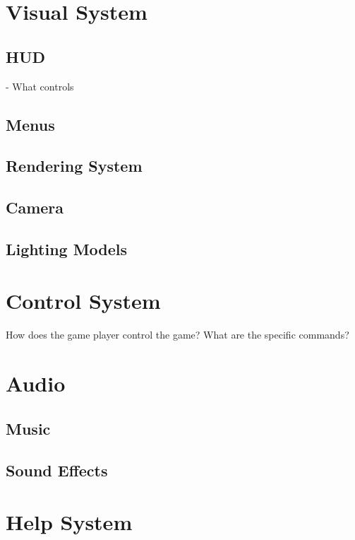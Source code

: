 \section{Visual System}
\subsection{HUD}
 - What controls
\subsection{Menus}
\subsection{Rendering System}
\subsection{Camera}
\subsection{Lighting Models}
\section{Control System}
  How does the game player control the game?   What are the specific commands?
\section{Audio}
\subsection{Music}
\subsection{Sound Effects}
\section{Help System}
